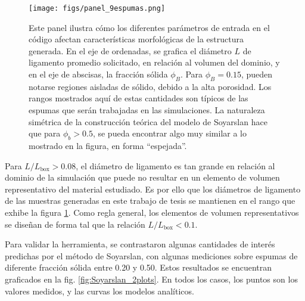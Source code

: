 \documentclass{article}
\begin{document}
\begin{figure}
    \centering
    \texttt{[image: figs/panel\_9espumas.png]}
    \caption{Este panel ilustra cómo los diferentes parámetros de entrada en el código afectan características morfológicas de la estructura generada. En el eje de ordenadas, se grafica el diámetro $L$ de ligamento promedio solicitado, en relación al volumen del dominio, y en el eje de abscisas, la fracción sólida $\phi_B$. Para $\phi_B=0.15$, pueden notarse regiones aisladas de sólido, debido a la alta porosidad. Los rangos mostrados aquí de estas cantidades son típicos de las espumas que serán trabajadas en las simulaciones. La naturaleza simétrica de la construcción teórica del modelo de Soyarslan hace que para  $\phi_b>0.5$, se pueda encontrar algo muy similar a lo mostrado en la figura, en forma ``espejada''.}
    \label{fig:panel_9espumas}
\end{figure}

Para $L/L_{\text{box}} > 0.08$, el diámetro de ligamento es tan grande en relación al dominio de la simulación que puede no resultar en un elemento de volumen representativo del material estudiado. Es por ello que los diámetros de ligamento de las muestras generadas en este trabajo de tesis se mantienen en el rango que exhibe la figura \ref{fig:panel_9espumas}. Como regla general, los elementos de volumen representativos se diseñan de forma tal que la relación $L/L_{\text{box}} < 0.1$. 

Para validar la herramienta, se contrastaron algunas cantidades de interés predichas por el método de Soyarslan, con algunas mediciones sobre espumas de diferente fracción sólida entre 0.20 y 0.50. Estos resultados se encuentran graficados en la fig. \ref{fig:Soyarslan_2plots}. En todos los casos, los puntos son los valores medidos, y las curvas los modelos analíticos.
\end{document}
